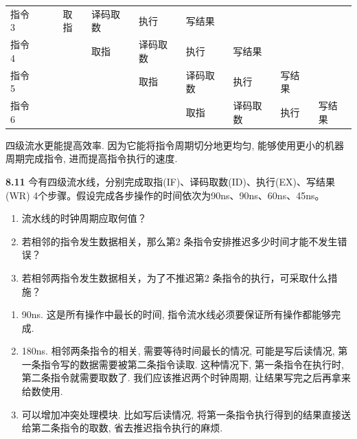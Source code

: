 \documentclass[UTF8]{report}
\newcommand{\problem}[1]{{\setlength{\parskip}{10pt}\noindent \bf{#1}}}
\newenvironment{solution}{{\noindent\hskip 2em \bf 解 \quad}}{}
\begin{document}
\begin{solution}
\begin{table}[htbp]
\begin{tabular}{lrrrrr|l|l|l|l|}
    \cline{3-7}    指令3 &   & \multicolumn{1}{r|}{} & \multicolumn{1}{l|}{取指} & \multicolumn{1}{l|}{译码取数} & \multicolumn{1}{l|}{执行} & 写结果 & \multicolumn{1}{r}{} & \multicolumn{1}{r}{} & \multicolumn{1}{r}{} \bigstrut\\
    \cline{4-8}    指令4 &   &   & \multicolumn{1}{r|}{} & \multicolumn{1}{l|}{取指} & \multicolumn{1}{l|}{译码取数} & 执行 & 写结果 & \multicolumn{1}{r}{} & \multicolumn{1}{r}{} \bigstrut\\
    \cline{5-9}    指令5 &   &   &   & \multicolumn{1}{r|}{} & \multicolumn{1}{l|}{取指} & 译码取数 & 执行 & 写结果 & \multicolumn{1}{r}{} \bigstrut\\
    \cline{6-10}    指令6 &   &   &   &   &   & 取指 & 译码取数 & 执行 & 写结果 \bigstrut\\
    \cline{7-10}    \end{tabular}%
        \label{tab:addlabel}%
    \end{table}%

    四级流水更能提高效率. 因为它能将指令周期切分地更均匀, 能够使用更小的机器周期完成指令, 进而提高指令执行的速度.
\end{solution}


\problem{8.11} 今有四级流水线，分别完成取指(IF)、译码取数(ID)、执行(EX)、写结果(WR) 4个步骤。假设完成各步操作的时间依次为90ns、90ns、60ns、45ns。
\begin{enumerate}[label=(\arabic*)]
    \item 流水线的时钟周期应取何值？
    \item 若相邻的指令发生数据相关，那么第2 条指令安排推迟多少时间才能不发生错误？
    \item 若相邻两指令发生数据相关，为了不推迟第2 条指令的执行，可采取什么措施？
\end{enumerate}

\begin{solution}
    \begin{enumerate}[label=(\arabic*)]
        \item 90ns. 这是所有操作中最长的时间, 指令流水线必须要保证所有操作都能够完成.
        \item 180ns. 相邻两条指令的相关, 需要等待时间最长的情况, 可能是写后读情况, 第一条指令写的数据需要被第二条指令读取. 这种情况下, 第一条指令在执行时, 第二条指令就需要取数了. 我们应该推迟两个时钟周期, 让结果写完之后再拿来给数使用.
        \item 可以增加冲突处理模块. 比如写后读情况,  将第一条指令执行得到的结果直接送给第二条指令的取数, 省去推迟指令执行的麻烦.
    \end{enumerate}
\end{solution}
\end{document}

